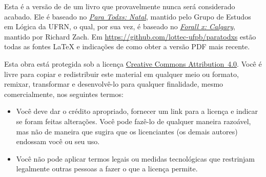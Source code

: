 \parbox{3 in}{
	
Esta é a versão de \mydate{} de um livro que provavelmente nunca será considerado acabado.
Ele é baseado no \href{https://github.com/Grupo-de-Estudos-em-Logica-da-UFRN/Para-Todxs-Natal}{\emph{Para Todxs: Natal}}, mantido pelo Grupo de Estudos em Lógica da UFRN, o qual, por sua vez, é baseado no \href{https://github.com/rzach/forallx-yyc}{\emph{Forall x: Calgary}}, mantido por Richard Zach.
Em \hbox{\url{https://github.com/lottec-ufpb/paratodxs}} estão todas as fontes \LaTeX{} e indicações de como obter a versão PDF mais recente.


Esta obra está protegida sob a licença \href{https://creativecommons.org/licenses/by/4.0/}{Creative Commons \hbox{Attribution 4.0}}. 
Você é livre para copiar e redistribuir este material em qualquer meio ou formato, remixar, transformar e desenvolvê-lo para qualquer finalidade, mesmo comercialmente, nos seguintes termos:
\begin{itemize}
\item Você deve dar o crédito apropriado, fornecer um link para a licença e indicar se foram feitas alterações. Você pode fazê-lo de qualquer maneira razoável, mas não de maneira que sugira que os licenciantes (os demais autores) endossam você ou seu uso.
\item Você não pode aplicar termos legais ou medidas tecnológicas que restrinjam legalmente outras pessoas a fazer o que a licença permite.
\end{itemize}
	}
\label{cc4by}


